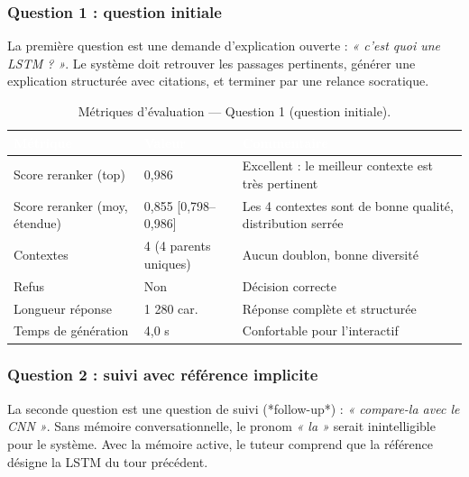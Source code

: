 \subsubsection{Question 1 : question initiale}

La première question est une demande d'explication ouverte : \textit{« c'est quoi une LSTM ? »}. Le système doit retrouver les passages pertinents, générer une explication structurée avec citations, et terminer par une relance socratique.

\begin{table}[H]
\centering
\begin{tabularx}{\linewidth}{L{3.5cm} L{2.5cm} L{6cm}}
\toprule
{}
\textcolor{white}{\textbf{Métrique}} & \textcolor{white}{\textbf{Valeur}} & \textcolor{white}{\textbf{Commentaire}} \\
\midrule
Score reranker (top)     & 0,986  & Excellent : le meilleur contexte est très pertinent \\
Score reranker (moy, étendue) & 0,855 [0,798--0,986] & Les 4 contextes sont de bonne qualité, distribution serrée \\
Contextes               & 4 (4 parents uniques) & Aucun doublon, bonne diversité \\
Refus                   & Non    & Décision correcte \\
Longueur réponse        & 1 280 car. & Réponse complète et structurée \\
Temps de génération     & 4,0 s  & Confortable pour l'interactif \\
\bottomrule
\end{tabularx}
\caption{Métriques d'évaluation --- Question 1 (question initiale).}
\label{tab:session-q1}
\end{table}

\subsubsection{Question 2 : suivi avec référence implicite}

La seconde question est une question de suivi (*follow-up*) : \textit{« compare-la avec le CNN »}. Sans mémoire conversationnelle, le pronom \textit{« la »} serait inintelligible pour le système. Avec la mémoire active, le tuteur comprend que la référence désigne la LSTM du tour précédent.

